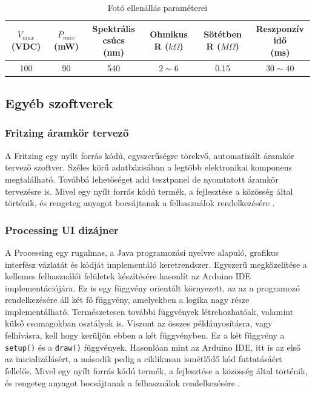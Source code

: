 \documentclass[a4paper,12pt]{article}
\begin{document}
\begin{table}[!htbp]
    \centering
    \begin{tabular}{|c|c|c|c|c|c|}\hline
        \specialcell{$V_{max}$\\(VDC)} & 
        \specialcell{$P_{max}$\\(mW)} & 
        \specialcell{Spektrális csúcs\\(nm)} & 
        \specialcell{Ohmikus R\\($k\Omega$)} & 
        \specialcell{Sötétben R\\($M\Omega$)} & 
        \specialcell{Reszponzív idő \\(ms)} \\ \hline
        100 & 90 & 540 &  $2\sim6$ & 0.15  & $30\sim40$  \\ \hline
    \end{tabular}
    \caption[LDR paraméterek]{Fotó ellenállás paraméterei}
    \label{ldrparams}
\end{table}

\subsection{Egyéb szoftverek}
\subsubsection{Fritzing áramkör tervező}
A Fritzing egy nyílt forrás kódú, egyszerűségre törekvő, automatizált áramkör tervező szoftver.
Széles körű adatbázisában a legtöbb elektronikai komponens megtalálható. Továbbá lehetőséget add tesztpanel de nyomtatott áramkör tervezésre is. Mivel egy nyílt forrás kódú termék, a fejlesztése a közösség által történik, és rengeteg anyagot bocsájtanak a felhasználok rendelkezésére \cite{frifo19}.
\subsubsection{Processing UI dizájner}
A Processing egy rugalmas, a Java programozási nyelvre alapuló, grafikus interfész vázlatát és kódját implementáló keretrendszer.
Egyszerű megközelítése a kellemes felhasználói felületek készítésére hasonlít az Arduino IDE implementációjára.
Ez is egy függvény orientált környezett, az az a programozó rendelkezésére áll két fő függvény, amelyekben a logika nagy része implementálható.
Természetesen további függvények létrehozhatóak, valamint külső csomagokban osztályok is. Viszont az összes példányosításra, vagy felhívásra, kell hogy kerüljön ebben a két függvényben. 
Ez a két függvény a \texttt{setup()} és a \texttt{draw()} függvények. 
Hasonlóan mint az Arduino IDE, itt is az első az inicializálásért, a második pedig a ciklikusan ismétlődő kód futtatásáért fellelős. Mivel egy nyílt forrás kódú termék, a fejlesztése a közösség által történik, és rengeteg anyagot bocsájtanak a felhasználok rendelkezésére \cite{profo19}.
\end{document}
